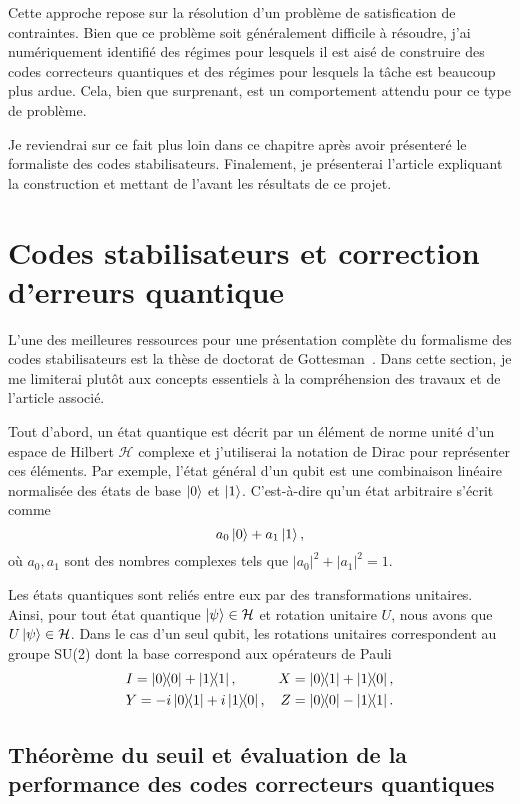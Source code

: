 Cette approche repose sur la résolution d'un problème de satisfication de contraintes.
Bien que ce problème soit généralement difficile à résoudre,
j'ai numériquement identifié des régimes pour lesquels il est aisé de
construire des codes correcteurs quantiques
et des régimes pour lesquels la tâche est beaucoup plus ardue.
Cela, bien que surprenant, est un comportement attendu pour ce type de problème.

Je reviendrai sur ce fait plus loin dans ce chapitre
après avoir présenteré le formaliste des codes stabilisateurs.
Finalement,
je présenterai l'article expliquant la construction et 
mettant de l'avant les résultats de ce projet.

\section{Codes stabilisateurs et correction d'erreurs quantique}

L'une des meilleures ressources pour une présentation complète du formalisme des codes
stabilisateurs est la thèse de doctorat de Gottesman~\cite{gottesman_stabilizer_1997}.
Dans cette section,
je me limiterai plutôt aux concepts essentiels à la compréhension des travaux et de l'article associé.

Tout d'abord,
un état quantique est décrit par un élément de norme unité 
d'un espace de Hilbert $\mathcal H$ complexe
et j'utiliserai la notation de Dirac pour représenter ces éléments.
Par exemple, l'état général d'un qubit est une combinaison linéaire normalisée 
des états de base $\ket{0}$ et $\ket{1}$.
C'est-à-dire qu'un état arbitraire s'écrit comme
\begin{equation}
	a_0\ket{0} + a_1\ket{1},
\end{equation}
où $a_0, a_1$ sont des nombres complexes tels que $|a_0|^2 + |a_1|^2 = 1$.

Les états quantiques sont reliés entre eux par des transformations unitaires.
Ainsi, pour tout état quantique $\ket{\psi} \in \mathcal H$ et rotation unitaire $U$,
nous avons que $U\ket{\psi} \in \mathcal H$.
Dans le cas d'un seul qubit,
les rotations unitaires correspondent au groupe SU(2) dont la base correspond aux opérateurs 
de Pauli 
\begin{align}
  &I = \op{0} + \op{1},
  &X = \op{0}{1} + \op{1}{0}, \notag\\
  &Y = -i\op{0}{1} + i\op{1}{0},
  &Z = \op{0} - \op{1}.
\end{align}


\subsection{Théorème du seuil et évaluation de la performance des codes correcteurs quantiques}




